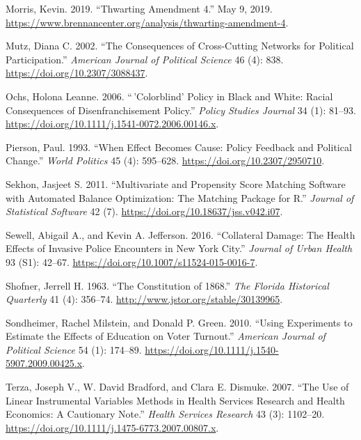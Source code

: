 \documentclass[
  12pt,
]{article}
\newlength{\cslhangindent}
\newenvironment{cslreferences}%
  {\setlength{\parindent}{0pt}%
  \everypar{\setlength{\hangindent}{\cslhangindent}}\ignorespaces}%
  {\par}
\begin{document}
\begin{cslreferences}
\leavevmode\hypertarget{ref-Morris2019}{}%
Morris, Kevin. 2019. ``Thwarting Amendment 4.'' May 9, 2019. \url{https://www.brennancenter.org/analysis/thwarting-amendment-4}.

\leavevmode\hypertarget{ref-Mutz2002}{}%
Mutz, Diana C. 2002. ``The Consequences of Cross-Cutting Networks for Political Participation.'' \emph{American Journal of Political Science} 46 (4): 838. \url{https://doi.org/10.2307/3088437}.

\leavevmode\hypertarget{ref-Ochs2006}{}%
Ochs, Holona Leanne. 2006. ``\,'Colorblind' Policy in Black and White: Racial Consequences of Disenfranchisement Policy.'' \emph{Policy Studies Journal} 34 (1): 81--93. \url{https://doi.org/10.1111/j.1541-0072.2006.00146.x}.

\leavevmode\hypertarget{ref-Pierson1993}{}%
Pierson, Paul. 1993. ``When Effect Becomes Cause: Policy Feedback and Political Change.'' \emph{World Politics} 45 (4): 595--628. \url{https://doi.org/10.2307/2950710}.

\leavevmode\hypertarget{ref-Sekhon2011}{}%
Sekhon, Jasjeet S. 2011. ``Multivariate and Propensity Score Matching Software with Automated Balance Optimization: The Matching Package for R.'' \emph{Journal of Statistical Software} 42 (7). \url{https://doi.org/10.18637/jss.v042.i07}.

\leavevmode\hypertarget{ref-Sewell2016}{}%
Sewell, Abigail A., and Kevin A. Jefferson. 2016. ``Collateral Damage: The Health Effects of Invasive Police Encounters in New York City.'' \emph{Journal of Urban Health} 93 (S1): 42--67. \url{https://doi.org/10.1007/s11524-015-0016-7}.

\leavevmode\hypertarget{ref-florida_1868}{}%
Shofner, Jerrell H. 1963. ``The Constitution of 1868.'' \emph{The Florida Historical Quarterly} 41 (4): 356--74. \url{http://www.jstor.org/stable/30139965}.

\leavevmode\hypertarget{ref-Sondheimer2010}{}%
Sondheimer, Rachel Milstein, and Donald P. Green. 2010. ``Using Experiments to Estimate the Effects of Education on Voter Turnout.'' \emph{American Journal of Political Science} 54 (1): 174--89. \url{https://doi.org/10.1111/j.1540-5907.2009.00425.x}.

\leavevmode\hypertarget{ref-Terza2007}{}%
Terza, Joseph V., W. David Bradford, and Clara E. Dismuke. 2007. ``The Use of Linear Instrumental Variables Methods in Health Services Research and Health Economics: A Cautionary Note.'' \emph{Health Services Research} 43 (3): 1102--20. \url{https://doi.org/10.1111/j.1475-6773.2007.00807.x}.


\end{cslreferences}
\end{document}
